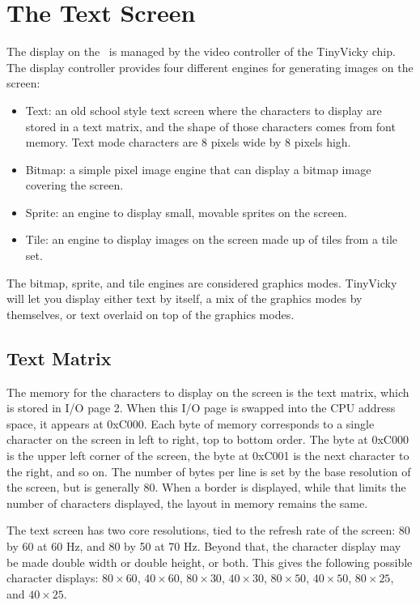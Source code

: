 \chapter{The Text Screen}

The display on the \jr\ is managed by the video controller of the TinyVicky chip. The display controller provides four different engines for generating images on the screen:

\begin{itemize}
    \item Text: an old school style text screen where the characters to display are stored in a text matrix, and the shape of those characters comes from font memory. Text mode characters are 8 pixels wide by 8 pixels high.
    \item Bitmap: a simple pixel image engine that can display a bitmap image covering the screen.
    \item Sprite: an engine to display small, movable sprites on the screen.
    \item Tile: an engine to display images on the screen made up of tiles from a tile set.
\end{itemize}

The bitmap, sprite, and tile engines are considered graphics modes. TinyVicky will let you display either text by itself, a mix of the graphics modes by themselves, or text overlaid on top of the graphics modes.

\section*{Text Matrix}

The memory for the characters to display on the screen is the text matrix, which is stored in I/O page 2. When this I/O page is swapped into the CPU address space, it appears at 0xC000. Each byte of memory corresponds to a single character on the screen in left to right, top to bottom order. The byte at 0xC000 is the upper left corner of the screen, the byte at 0xC001 is the next character to the right, and so on. The number of bytes per line is set by the base resolution of the screen, but is generally 80. When a border is displayed, while that limits the number of characters displayed, the layout in memory remains the same.

The text screen has two core resolutions, tied to the refresh rate of the screen: 80 by 60 at 60 Hz, and 80 by 50 at 70 Hz. Beyond that, the character display may be made double width or double height, or both. This gives the following possible character displays: $80 \times 60$, $40 \times 60$, $80 \times 30$, $40 \times 30$, $80 \times 50$, $40 \times 50$, $80 \times 25$, and $40 \times 25$.

